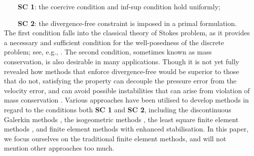 \documentclass[12pt,showkeys]{amsart}
\begin{document}
~~~~\textbf{SC 1}: the coercive condition and inf-sup condition hold uniformly;

~~~~\textbf{SC 2}: the divergence-free constraint is imposed in a primal formulation.
\\
The first condition falls into the classical theory of Stokes problem, as it provides a necessary and sufficient condition for the well-posedness of the discrete problem; see, e.g., \cite{Girault.V;Raviart.P,Babuska.I1973,Brezzi1974}. The second condition, sometimes known as mass conservation, is also desirable in many applications. Though it is not yet fully revealed how methods that enforce divergence-free would be superior to those that do not, satisfying the property can decouple the pressure error from the velocity error, and can avoid possible instabilities that can arise from violation of mass conservation \cite{Auricchio.F;daVeiga.L;Lovadina.C;Reali.A2010,Cousins.B;Borne.S;Linke.A;Rebholz.L;Wang.Z2013,Linke.A2009,Linke.A;Matthies.G;Tobiska.L2008}. Various approaches have been utilised to develop methods in regard to the conditions both \textbf{SC 1} and \textbf{SC 2}, including the discontinuous Galerkin methods \cite{Carrero.J;Cockburn.B;Schotzau.D2006,Cockburn.B;Kanschat.G;Schotzau.D2007,Cockburn.B;Kanschat.G;Schotzau.D2004,Cockburn.B;Kanschat.G;Schotzau.D2005}, the isogeometric methods \cite{Evans.J;Hughes.T2012,Evans.J;Hughes.T2013}, the least square finite element methods \cite{Bochev.P;Lai.J;Olson.L2013,Bolton.P;Thatcher.R2005,Chang.C;Nelson.J1997,Heys.J;Lee.E;Manteuffel.T;McCormick.S2006}, and finite element methods with enhanced stabilisation\cite{Bejanov.B;Guermond.J;Minev.P2005,Boffi.D;Cavallini.N;Gardini.F;Gastaldi.L2012,Burman.E;Linke.A2008,Case.M;Ervin.V;Linke.A;Rebholz.L2011,Olshanskii.M;Reusken.A2004}. In this paper, we focus ourselves on the traditional finite element methods, and will not mention other approaches too much.
\end{document}
